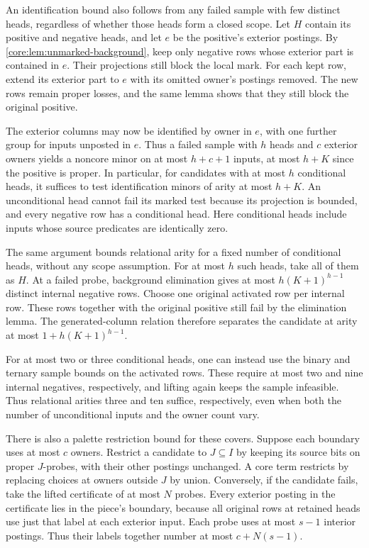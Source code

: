 An identification bound also follows from
any failed sample with few distinct heads,
regardless of whether those heads form a
closed scope. Let $H$ contain its positive
and negative heads, and let $e$ be the
positive's exterior postings. By
\cref{core:lem:unmarked-background},
keep only negative rows whose exterior
part is contained in $e$. Their projections
still block the local mark. For each kept
row, extend its exterior part to $e$
with its omitted owner's postings removed.
The new rows remain proper losses, and
the same lemma shows that they still
block the original positive.

The exterior columns may now be identified
by owner in $e$, with one further group
for inputs unposted in $e$. Thus a
failed sample with $h$ heads and $c$
exterior owners yields a noncore minor
on at most $h+c+1$ inputs, at most
$h+K$ since the positive is proper.
In particular, for candidates with at
most $h$ conditional heads, it suffices
to test identification minors of arity
at most $h+K$. An unconditional head
cannot fail its marked test because
its projection is bounded, and every
negative row has a conditional head.
Here conditional heads include inputs
whose source predicates are identically
zero.

The same argument bounds relational arity
for a fixed number of conditional heads,
without any scope assumption. For at most
$h$ such heads, take all of them as $H$.
At a failed probe, background elimination
gives at most $h(K+1)^{h-1}$ distinct
internal negative rows. Choose one
original activated row per internal row.
These rows together with the original
positive still fail by the elimination
lemma. The generated-column relation
therefore separates the candidate at
arity at most $1+h(K+1)^{h-1}$.

For at most two or three conditional
heads, one can instead use the binary
and ternary sample bounds on the
activated rows. These require at most
two and nine internal negatives,
respectively, and lifting again keeps
the sample infeasible. Thus relational
arities three and ten suffice,
respectively, even when both the
number of unconditional inputs and the
owner count vary.

There is also a palette restriction bound
for these covers. Suppose each boundary
uses at most $c$ owners. Restrict a candidate
to $J\subseteq I$ by keeping its source
bits on proper $J$-probes, with their other
postings unchanged. A core term restricts
by replacing choices at owners outside
$J$ by union. Conversely, if the candidate
fails, take the lifted certificate of
at most $N$ probes. Every exterior
posting in the certificate lies in the
piece's boundary, because all original
rows at retained heads use just that
label at each exterior input. Each
probe uses at most $s-1$ interior
postings. Thus their labels together
number at most $c+N(s-1)$.

